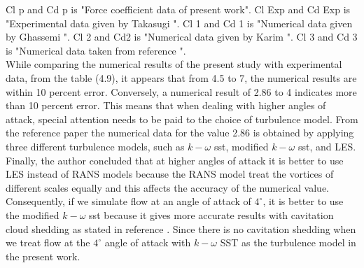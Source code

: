 Cl p and Cd p is "Force coefficient data of present work".
Cl Exp and Cd Exp is "Experimental data given by Takasugi \cite{Zhao2021}".
Cl 1 and Cd 1 is "Numerical data given by Ghassemi \cite{Zhao2021}".
Cl 2 and Cd2 is "Numerical data given by Karim \cite{Zhao2021}".
Cl 3 and Cd 3 is "Numerical data taken from reference \cite{Zhao2021}".\\

While comparing the numerical results of the present study with experimental data, from the table (4.9), 
it appears that from 4.5 to 7, the numerical results are within 
10 percent error. Conversely, a numerical result of 2.86 to 4 indicates more than 10 percent error. 
This means that when dealing with higher angles of attack, special attention needs to be 
paid to the choice of turbulence model. From the reference paper \cite{Zhao2021} the numerical data for the
value 2.86 is obtained by applying three different turbulence models, such as $k- \omega$ sst,
modified $k - \omega$ sst, and LES. Finally, the author concluded that at  higher angles of attack 
it is better to use LES instead of RANS models because the RANS model treat the vortices of different 
scales equally and this affects the accuracy of the numerical value. Consequently, if we simulate flow 
at an angle of attack of $4^{\circ}$, it is better to use the modified $k- \omega$ sst because it gives more accurate 
results with cavitation cloud shedding as stated in reference \cite{Zhao2021}. Since there is no cavitation 
shedding when we treat flow at the $4^{\circ}$ angle of attack with $k- \omega$ SST as the turbulence model in the present work.
